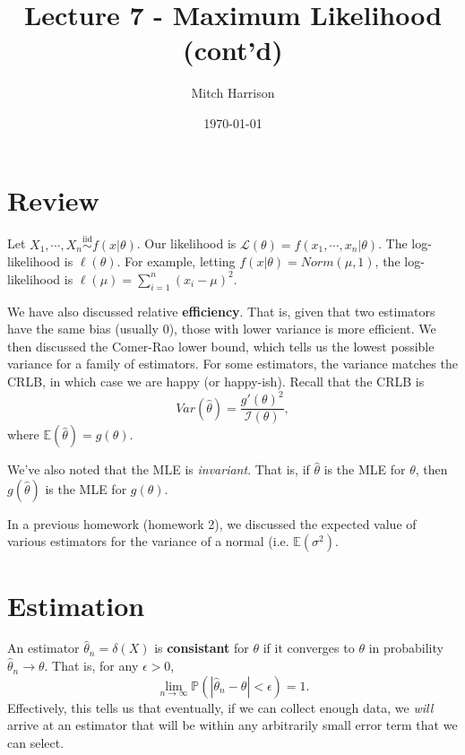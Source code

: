 \documentclass[titlepage, 12pt, leqno]{article}
\title{\Huge{Lecture 7 - Maximum Likelihood (cont'd)}}
\author{\large{Mitch Harrison}}
\date{\today}
\begin{document}
\setlength{\parskip}{1\baselineskip}
\setlength{\parindent}{15pt}
\maketitle
\tableofcontents
\newpage


\section{Review}

Let $X_{1}, \cdots , X_{n} \overset{\mathrm{iid}}{\sim} f(x|\theta)$. Our 
likelihood is $\mathcal{L}(\theta) = f(x_{1}, \cdots ,x_{n}|\theta)$. The
log-likelihood is $\ell(\theta)$. For example, letting $f(x|\theta) = 
Norm(\mu,1)$, the log-likelihood is $\ell(\mu) = \sum_{i=1}^{n}(x_{i}-\mu)^{2}$.

We have also discussed relative \textbf{efficiency}. That is, given that two
estimators have the same bias (usually 0), those with lower variance is more
efficient. We then discussed the Comer-Rao lower bound, which tells us the
lowest possible variance for a family of estimators. For some estimators, the
variance matches the CRLB, in which case we are happy (or happy-ish). Recall
that the CRLB is
\[
Var(\hat \theta) = \frac{g'(\theta)^{2}}{\mathcal{I}(\theta)}, 
\]
where $\mathbb{E}(\hat \theta) = g(\theta)$.

We've also noted that the MLE is \textit{invariant}. That is, if $\hat \theta$
is the MLE for $\theta$, then $g(\hat \theta)$ is the MLE for $g(\theta)$.

In a previous homework (homework 2), we discussed the expected value of various
estimators for the variance of a normal (i.e. $\mathbb{E}(\sigma^{2})$.

\pagebreak
\section{Estimation}
\begin{definition}
    An estimator $\hat \theta_{n} = \delta(X)$ is \textbf{consistant} for
    $\theta$ if it converges to $\theta$ in probability $\hat \theta_{n}
    \rightarrow \theta$. That is, for any $\epsilon > 0$,
    \[
    \lim_{n \to \infty} \mathbb{P}(|\hat \theta_{n} - \theta| < \epsilon) = 1.
    \]
    Effectively, this tells us that eventually, if we can collect enough data,
    we \textit{will} arrive at an estimator that will be within any arbitrarily
    small error term that we can select.
\end{definition}
\end{document}
